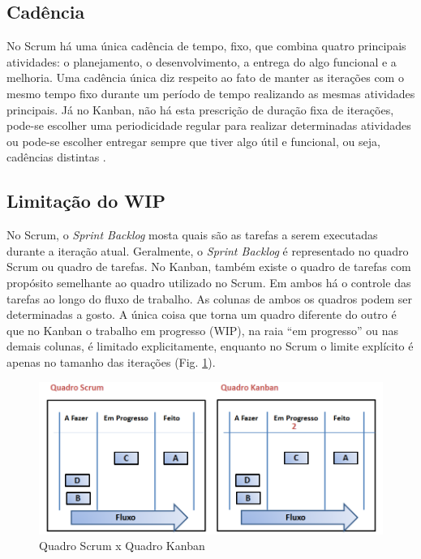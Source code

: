 \subsection[Cadência]{Cadência}

No Scrum há uma única cadência de tempo, fixo, que combina quatro principais atividades: o planejamento, o desenvolvimento, a entrega do algo funcional e a melhoria. Uma cadência única diz respeito ao fato de manter as iterações com o mesmo tempo fixo durante um período de tempo realizando as mesmas atividades principais. Já no Kanban, não há esta prescrição de duração fixa de iterações, pode-se escolher uma periodicidade regular para realizar determinadas atividades ou pode-se escolher entregar sempre que tiver algo útil e funcional, ou seja, cadências distintas  \cite{kniberg2009}. 

\subsection[Limitação do WIP]{Limitação do WIP}

No Scrum, o \textit{Sprint Backlog} mosta quais são as tarefas a serem executadas durante a iteração atual. Geralmente, o \textit{Sprint Backlog} é representado no quadro Scrum ou quadro de tarefas. No Kanban, também existe o quadro de tarefas com propósito semelhante ao quadro utilizado no Scrum. Em ambos há o controle das tarefas ao longo do fluxo de trabalho. As colunas de ambos os quadros podem ser determinadas a gosto. A única coisa que torna um quadro diferente do outro é que no Kanban o trabalho em progresso (WIP), na raia “em progresso” ou nas demais colunas, é limitado explicitamente, enquanto no Scrum o limite explícito é apenas no tamanho das iterações (Fig. \ref{quadros}). 

\begin{figure}[H]
		\centering
		\label{fig03}
			\includegraphics[scale=0.7]{figuras/quadros.png}
		\caption{Quadro Scrum x Quadro Kanban  \cite{kniberg2009}}
\label{quadros}
\end{figure}

